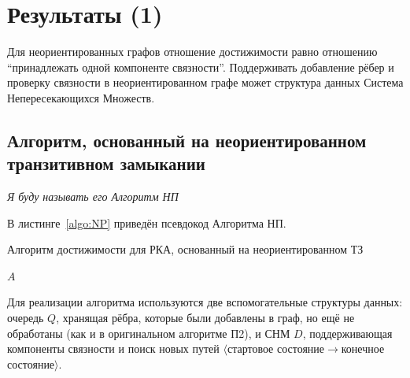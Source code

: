 \section{Результаты (1)}\label{section:bidirected}

Для неориентированных графов отношение достижимости равно отношению ``принадлежать одной компоненте связности''. Поддерживать добавление рёбер и проверку связности в неориентированном графе может структура данных Система Непересекающихся Множеств. 

\begin{definition}
    \TODO
\end{definition}

\subsection{Алгоритм, основанный на неориентированном транзитивном замыкании}

\textit{Я буду называть его Алгоритм НП}

В листинге~\ref{algo:NP} приведён псевдокод Алгоритма НП.

\begin{algorithm}[H]
    \begin{algorithmic}[1]
    \caption{Алгоритм достижимости для РКА, основанный на неориентированном ТЗ}
    \label{algo:NP}
            \EndFor
        \EndFor
            \EndIf
        \EndWhile
    \State \Return $A$
    \EndFunction
    \end{algorithmic}
\end{algorithm}

Для реализации алгоритма используются две вспомогательные структуры данных: очередь $Q$, хранящая рёбра, которые были добавлены в граф, но ещё не обработаны (как и в оригинальном алгоритме П2), и СНМ $D$, поддерживающая компоненты связности и поиск новых путей $\langle$стартовое состояние$\to$конечное состояние$\rangle$. 

